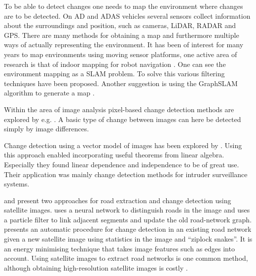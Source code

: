 To be able to detect changes one needs to map the environment where changes are to be detected. On \ac{AD} and \ac{ADAS} vehicles several sensors collect information about the surroundings and position, such as cameras, \ac{LiDAR}, \ac{RADAR} and \ac{GPS}. There are many methods for obtaining a map and furthermore multiple ways of actually representing the environment. It has been of interest for many years to map environments using moving sensor platforms, one active area of research is that of indoor mapping for robot navigation \citep{1988robot} \citep{Teller2003} \citep{robnav}. One can see the environment mapping as a \ac{SLAM} problem. To solve this various filtering techniques have been proposed. Another suggestion is using the GraphSLAM algorithm to generate a map \citep{GraphSLAM}. %


Within the area of image analysis pixel-based change detection methods are explored by e.g. \cite{pixelbased}. A basic type of change between images can here be detected simply by image differences.

Change detection using a vector model of images has been explored by \cite{linalg}. Using this approach enabled incorporating useful theorems from linear algebra. Especially they found linear dependence and independence to be of great use. Their application was mainly change detection methods for intruder surveillance systems. 


\cite{satellite} and \cite{sat2} present two approaches for road extraction and change detection using satellite images. \cite{sat2} uses a neural network to distinguish roads in the image and uses a particle filter to link adjacent segments and update the old road-network graph. \cite{satellite} presents an automatic procedure for change detection in an existing road network given a new satellite image using statistics in the image and ``ziplock snakes''. It is an energy minimising technique that takes image features such as edges into account. Using satellite images to extract road networks is one common method, although obtaining high-resolution satellite images is costly \citep{hymu}.

